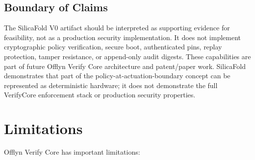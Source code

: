 \documentclass[10pt]{article}
\newcommand{\ovc}{Offlyn Verify Core\xspace}
\begin{document}
\subsection{Boundary of Claims}

The SilicaFold V0 artifact should be interpreted as supporting evidence for feasibility, not as a production security implementation. It does not implement cryptographic policy verification, secure boot, authenticated pins, replay protection, tamper resistance, or append-only audit digests. These capabilities are part of future \ovc architecture and patent/paper work. SilicaFold demonstrates that part of the policy-at-actuation-boundary concept can be represented as deterministic hardware; it does not demonstrate the full VerifyCore enforcement stack or production security properties.

\section{Limitations}

\ovc has important limitations:
\end{document}
